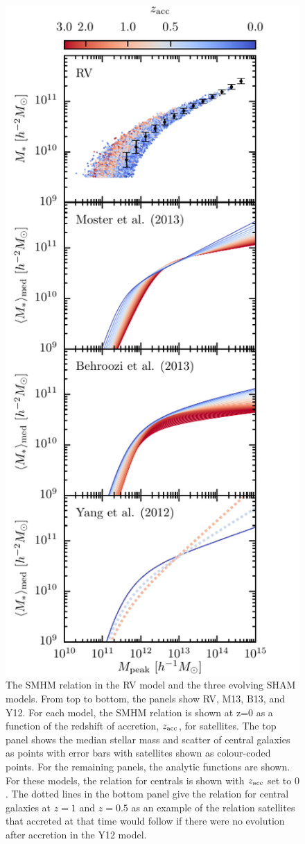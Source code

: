 \documentclass[a4paper,fleqn,usenatbib]{mnras}
\begin{document}
\begin{figure}
    \includegraphics{figures/SMHM_comparison.pdf}
    \caption{The SMHM relation in the RV model and the three evolving SHAM models.  From top to bottom, the panels show RV, M13, B13, and Y12.  For each model, the SMHM relation is shown at z=0 as a function of the redshift of accretion, $z_{\rm acc}$, for satellites.  The top panel shows the median stellar mass and scatter of central galaxies as points with error bars with satellites shown as colour-coded points.  For the remaining panels, the analytic functions are shown. For these models, the relation for centrals is shown with $z_{\rm acc}$ set to $0$.  The dotted lines in the bottom panel give the relation for central galaxies at $z=1$ and $z=0.5$ as an example of the relation satellites that accreted at that time would follow if there were no evolution after accretion in the Y12 model.}

\end{figure}
\end{document}
